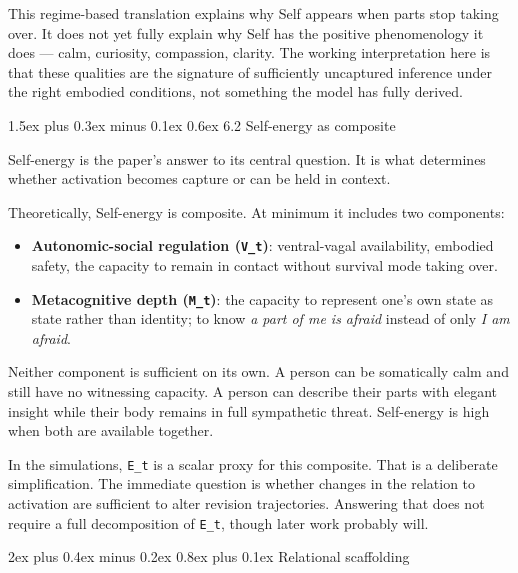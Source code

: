 \documentclass[12pt,a4paper]{article}
\makeatletter
\providecommand{\tightlist}{%
  \setlength{\itemsep}{0pt}\setlength{\parskip}{0pt}}
\renewcommand\subsection{\@startsection{subsection}{2}{0pt}%
  {2ex plus 0.4ex minus 0.2ex}%
  {0.8ex plus 0.1ex}%
  {\normalsize\itshape}}
\renewcommand\subsubsection{\@startsection{subsubsection}{3}{0pt}%
  {1.5ex plus 0.3ex minus 0.1ex}%
  {0.6ex}%
  {\normalsize\itshape}}
\makeatother
\begin{document}
This regime-based translation explains why Self appears when parts stop
taking over. It does not yet fully explain why Self has the positive
phenomenology it does --- calm, curiosity, compassion, clarity. The
working interpretation here is that these qualities are the signature of
sufficiently uncaptured inference under the right embodied conditions,
not something the model has fully derived.

\subsubsection{6.2 Self-energy as
composite}\label{self-energy-as-composite}

Self-energy is the paper's answer to its central question. It is what
determines whether activation becomes capture or can be held in context.

Theoretically, Self-energy is composite. At minimum it includes two
components:

\begin{itemize}
\tightlist
\item
  \textbf{Autonomic-social regulation (\texttt{V\_t})}: ventral-vagal
  availability, embodied safety, the capacity to remain in contact
  without survival mode taking over.
\item
  \textbf{Metacognitive depth (\texttt{M\_t})}: the capacity to
  represent one's own state as state rather than identity; to know
  \emph{a part of me is afraid} instead of only \emph{I am afraid}.
\end{itemize}

Neither component is sufficient on its own. A person can be somatically
calm and still have no witnessing capacity. A person can describe their
parts with elegant insight while their body remains in full sympathetic
threat. Self-energy is high when both are available together.

In the simulations, \texttt{E\_t} is a scalar proxy for this composite.
That is a deliberate simplification. The immediate question is whether
changes in the relation to activation are sufficient to alter revision
trajectories. Answering that does not require a full decomposition of
\texttt{E\_t}, though later work probably will.

\subsection{Relational scaffolding}\label{relational-scaffolding}
\end{document}
